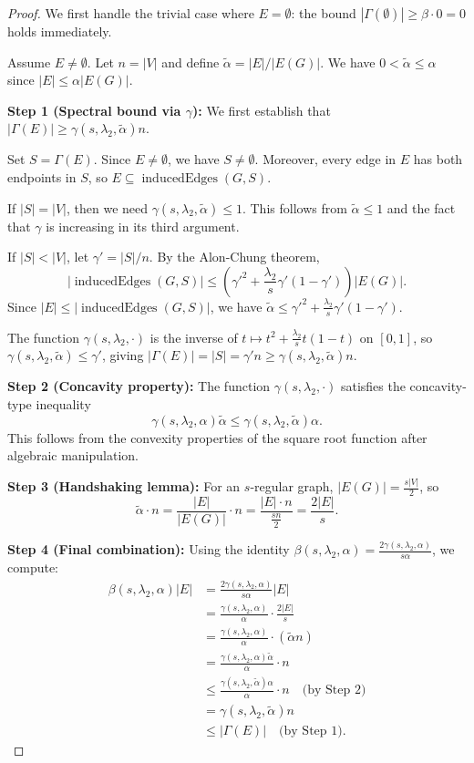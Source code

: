 \documentclass[11pt]{article}
\theoremstyle{plain}
\theoremstyle{definition}
\theoremstyle{remark}
\begin{document}
\begin{proof}
We first handle the trivial case where $E = \emptyset$: the bound $|\Gamma(\emptyset)| \geq \beta \cdot 0 = 0$ holds immediately.

Assume $E \neq \emptyset$. Let $n = |V|$ and define $\tilde{\alpha} = |E|/|E(G)|$. We have $0 < \tilde{\alpha} \leq \alpha$ since $|E| \leq \alpha|E(G)|$.

\textbf{Step 1 (Spectral bound via $\gamma$):} We first establish that $|\Gamma(E)| \geq \gamma(s, \lambda_2, \tilde{\alpha})n$. 

Set $S = \Gamma(E)$. Since $E \neq \emptyset$, we have $S \neq \emptyset$. Moreover, every edge in $E$ has both endpoints in $S$, so $E \subseteq \operatorname{inducedEdges}(G,S)$.

If $|S| = |V|$, then we need $\gamma(s, \lambda_2, \tilde{\alpha}) \leq 1$. This follows from $\tilde{\alpha} \leq 1$ and the fact that $\gamma$ is increasing in its third argument.

If $|S| < |V|$, let $\gamma' = |S|/n$. By the Alon-Chung theorem,
\[
|\operatorname{inducedEdges}(G,S)| \leq \left(\gamma'^2 + \frac{\lambda_2}{s}\gamma'(1-\gamma')\right)|E(G)|.
\]
Since $|E| \leq |\operatorname{inducedEdges}(G,S)|$, we have $\tilde{\alpha} \leq \gamma'^2 + \frac{\lambda_2}{s}\gamma'(1-\gamma')$.

The function $\gamma(s, \lambda_2, \cdot)$ is the inverse of $t \mapsto t^2 + \frac{\lambda_2}{s}t(1-t)$ on $[0,1]$, so $\gamma(s, \lambda_2, \tilde{\alpha}) \leq \gamma'$, giving $|\Gamma(E)| = |S| = \gamma' n \geq \gamma(s, \lambda_2, \tilde{\alpha})n$.

\textbf{Step 2 (Concavity property):} The function $\gamma(s, \lambda_2, \cdot)$ satisfies the concavity-type inequality
\[
\gamma(s, \lambda_2, \alpha) \tilde{\alpha} \leq \gamma(s, \lambda_2, \tilde{\alpha}) \alpha.
\]
This follows from the convexity properties of the square root function after algebraic manipulation.

\textbf{Step 3 (Handshaking lemma):} For an $s$-regular graph, $|E(G)| = \frac{s|V|}{2}$, so
\[
\tilde{\alpha} \cdot n = \frac{|E|}{|E(G)|} \cdot n = \frac{|E| \cdot n}{\frac{sn}{2}} = \frac{2|E|}{s}.
\]

\textbf{Step 4 (Final combination):} Using the identity $\beta(s, \lambda_2, \alpha) = \frac{2\gamma(s, \lambda_2, \alpha)}{s\alpha}$, we compute:
\begin{align*}
\beta(s, \lambda_2, \alpha)|E| &= \frac{2\gamma(s, \lambda_2, \alpha)}{s\alpha}|E| \\
&= \frac{\gamma(s, \lambda_2, \alpha)}{\alpha} \cdot \frac{2|E|}{s} \\
&= \frac{\gamma(s, \lambda_2, \alpha)}{\alpha} \cdot (\tilde{\alpha} n) \\
&= \frac{\gamma(s, \lambda_2, \alpha) \tilde{\alpha}}{\alpha} \cdot n \\
&\leq \frac{\gamma(s, \lambda_2, \tilde{\alpha}) \alpha}{\alpha} \cdot n \quad \text{(by Step 2)} \\
&= \gamma(s, \lambda_2, \tilde{\alpha}) n \\
&\leq |\Gamma(E)| \quad \text{(by Step 1)}.
\end{align*}
\end{proof}
\end{document}
